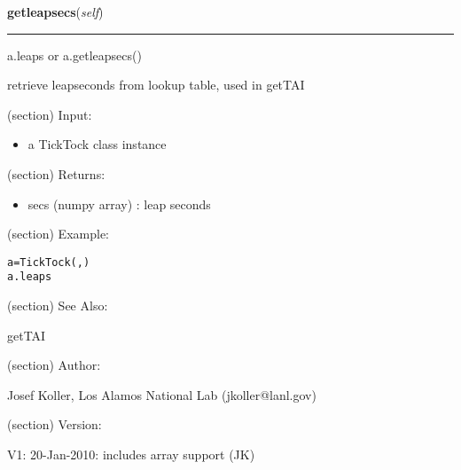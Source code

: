    \label{spacepy:spacetime:TickTock:getleapsecs}

    \vspace{0.5ex}

\hspace{.8\funcindent}\begin{boxedminipage}{\funcwidth}

    \raggedright \textbf{getleapsecs}(\textit{self})

    \vspace{-1.5ex}

    \rule{\textwidth}{0.5\fboxrule}
\setlength{\parskip}{2ex}
    a.leaps or a.getleapsecs()

    retrieve leapseconds from lookup table, used in getTAI

    (section) Input:

      \begin{itemize}
      \setlength{\parskip}{0.6ex}
        \item a TickTock class instance

      \end{itemize}

    (section) Returns:

      \begin{itemize}
      \setlength{\parskip}{0.6ex}
        \item secs (numpy array) : leap seconds

      \end{itemize}

    (section) Example:

\begin{alltt}
\pysrcprompt{{\textgreater}{\textgreater}{\textgreater} }a = TickTock(, )
\pysrcprompt{{\textgreater}{\textgreater}{\textgreater} }a.leaps
\end{alltt}
    (section) See Also:

      getTAI

    (section) Author:

      Josef Koller, Los Alamos National Lab (jkoller@lanl.gov)

    (section) Version:

      V1: 20-Jan-2010: includes array support (JK)

\setlength{\parskip}{1ex}
    \end{boxedminipage}


